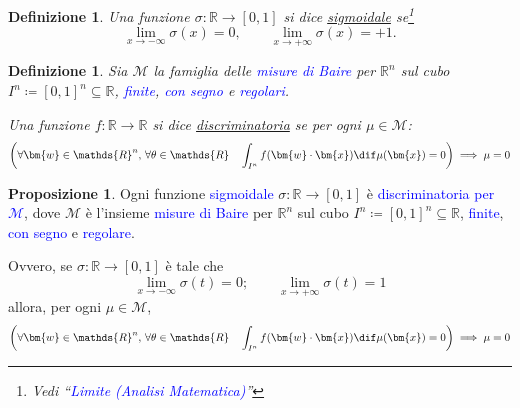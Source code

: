 \documentclass[10pt]{book}
\newcommand{\1}{\mathds{1}}
\newcommand{\R}{\mathds{R}}
\theoremstyle{definition}%
\newtheorem{prop}[thm]{Proposizione}
\theoremstyle{plain}
\newtheorem{definizione}[thm]{Definizione}
\theoremstyle{remark}
\renewcommand{\href}[2]{\textcolor{blue}{#2}}
\begin{document}
\begin{definizione}
Una funzione \(\sigma:\R\to [0,1]\) si dice \uline{sigmoidale} se\footnote{Vedi ``\href{../../../../../org/roam/20250625110412-limite_analisi_matematica.org}{Limite (Analisi Matematica)}''}
\begin{equation*}
\lim_{x\to-\infty} \sigma(x) = 0,\qquad \lim_{x\to +\infty} \sigma(x)= +1.
\end{equation*}
\end{definizione}
\begin{definizione}
Sia \(\mathcal{M}\) la famiglia delle \href{../../../../../org/roam/20250625104200-misura_di_baire.org}{misure di Baire} per \(\R^{n}\) sul cubo \(I^{n} \coloneqq [0,1]^{n} \subseteq \R\), \href{../../../../../org/roam/20250625110016-misura_finita.org}{finite}, \href{../../../../../org/roam/20250625110024-misura_con_segno.org}{con segno} e \href{../../../../../org/roam/20250625110032-misura_regolare.org}{regolari}.

Una funzione \(f: \R\to \R\) si dice \uline{discriminatoria} se per ogni \(\mu \in \mathcal{M}\):
\begin{equation*}
\left(\forall \bm{w} \in \R^{n},\, \forall \theta \in \R\quad \int_{I^{n}} f(\bm{w}\cdot\bm{x}) \dif \mu(\bm{x}) = 0\right)\implies \mu=0
\end{equation*}
\end{definizione}
\begin{prop}
Ogni funzione \href{../../../../../org/roam/20250625110110-funzione_sigmoidale.org}{sigmoidale} \(\sigma:\R\to [0,1]\) è \href{../../../../../org/roam/20250625105528-funzione_discriminatoria_per_una_misura_di_baire_sul_cubo_unitario.org}{discriminatoria per \(\mathcal{M}\)}, dove \(\mathcal{M}\) è l'insieme \href{../../../../../org/roam/20250625104200-misura_di_baire.org}{misure di Baire} per \(\R^{n}\) sul cubo \(I^{n} \coloneqq [0,1]^{n} \subseteq \R\), \href{../../../../../org/roam/20250625110016-misura_finita.org}{finite}, \href{../../../../../org/roam/20250625110024-misura_con_segno.org}{con segno} e \href{../../../../../org/roam/20250625110032-misura_regolare.org}{regolare}.

Ovvero, se \(\sigma:\R\to [0,1]\) è tale che
\begin{equation*}
\lim_{x\to-\infty}\sigma(t) =0;\qquad \lim_{x\to+\infty}\sigma(t)=1
\end{equation*}
allora, per ogni \(\mu \in \mathcal{M}\),
\begin{equation*}
\left(\forall \bm{w} \in \R^{n},\, \forall \theta \in \R\quad \int_{I^{n}} f(\bm{w}\cdot\bm{x}) \dif \mu(\bm{x}) = 0\right)\implies \mu=0
\end{equation*}
\end{prop}
\end{document}
